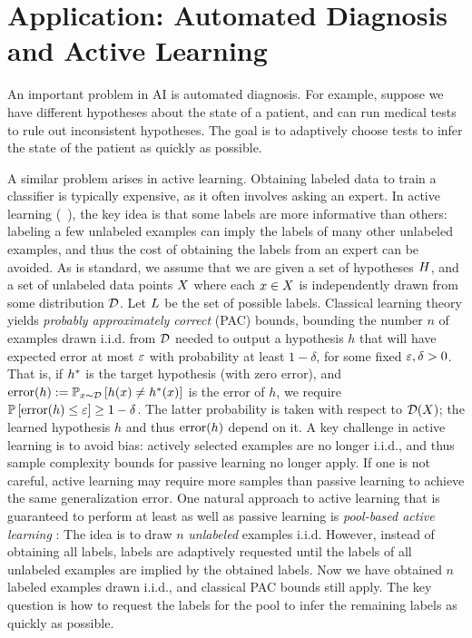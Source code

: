 %
%
%
%
\section{Application: Automated Diagnosis and Active Learning} \label{sec:active-learning}
%

%
%
%
An important problem in AI is automated diagnosis. For example, suppose we have different hypotheses about the state of a patient, and can run medical tests to rule out inconsistent hypotheses. The goal is to adaptively choose tests to infer the state of the patient as quickly as possible.

A similar problem arises in active learning. Obtaining labeled data to train a classifier is typically expensive, as it often involves asking an expert. In active learning (\cf~\citet{cohn96active,mccallum98}), the key idea is that some labels are more informative than others: labeling a few unlabeled examples can imply the labels of many other unlabeled examples, and thus the cost of obtaining the labels from an expert can be avoided. As is standard, we assume that we are given a set of hypotheses $H$,
and a set of unlabeled data points $X$ where each $x \in X$
is independently drawn from some
distribution $\mathcal{D}$.  Let $L$ be the set of possible labels.  
Classical learning theory yields \emph{probably approximately correct} (PAC) bounds, bounding the number $n$ of examples drawn i.i.d. from $\mathcal{D}$ needed to output a hypothesis $h$ that will have expected error at most $\varepsilon$ with probability at least $1 - \delta$,
for some fixed $\varepsilon, \delta > 0$.  That is, if $h^*$ is the 
target hypothesis (with zero error), and 
$\operatorname{error}(h) := \mathbb{P}_{x \sim \mathcal{D}}\left[h(x) \neq h^*(x)\right] $
is the error of $h$, 
 we require
$\mathbb{P}\left[\operatorname{error}(h)  \le \varepsilon \right]  \ge 1 - \delta$.
The latter probability is taken with respect to $\mathcal{D}(X)$;  the learned
hypothesis $h$ and thus $\operatorname{error}(h)$ depend on it.
A key challenge in active learning is to avoid bias: actively selected examples are no longer i.i.d., and thus sample complexity bounds for passive learning no longer apply.  If one is not careful, active learning may require more samples than passive learning to achieve the same generalization error.
One natural approach to active learning that is guaranteed to perform at least as well as passive learning is \emph{pool-based active learning} \citep{mccallum98}: The idea is to draw $n$ \emph{unlabeled} examples i.i.d. However, instead of obtaining all labels, labels are adaptively requested until the labels of all unlabeled examples are implied by the obtained labels. Now we have obtained $n$ labeled examples drawn i.i.d., and classical PAC bounds still apply. The key question is how to request the labels for the pool to infer the remaining labels as quickly as possible.




